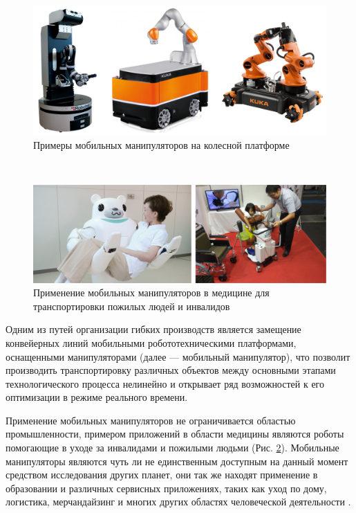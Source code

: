 \documentclass[14pt, a4paper]{extreport}
\begin{document}
\vspace{\fill}
\begin{figure}[!h]
\centering
\captionsetup{justification=centering}
\renewcommand{\figurename}{Рисунок}
\includegraphics[width=1\textwidth]{mm-.png}	%
\caption{Примеры мобильных манипуляторов на колесной платформе}
\label{pic:1}
\end{figure}
\newpage
\ \\
\vspace{-5mm}
\begin{figure}[!h]
\centering
\captionsetup{justification=centering}
\renewcommand{\figurename}{Рисунок}
\includegraphics[width=1\textwidth]{med.jpg}	%
\caption{Применение мобильных манипуляторов в медицине для транспортировки пожилых людей и инвалидов}
\label{pic:2}
\end{figure}

Одним из путей организации гибких производств является замещение конвейерных линий мобильными робототехническими платформами, оснащенными манипуляторами (далее --- мобильный манипулятор), что позволит производить транспортировку различных объектов между основными этапами технологического процесса нелинейно и открывает ряд возможностей к его оптимизации в режиме реального времени.

Применение мобильных манипуляторов не ограничивается областью промышленности, примером приложений в области медицины являются роботы помогающие в уходе за инвалидами и пожилыми людьми (Рис. \ref{pic:2}). Мобильные манипуляторы являются чуть ли не единственным доступным на данный момент средством исследования других планет, они так же находят применение в образовании и различных сервисных приложениях, таких как уход по дому, логистика, мерчандайзинг и многих других областях человеческой деятельности \cite{Fantini, Khatib, Stopp, Jones}. 
\end{document}
